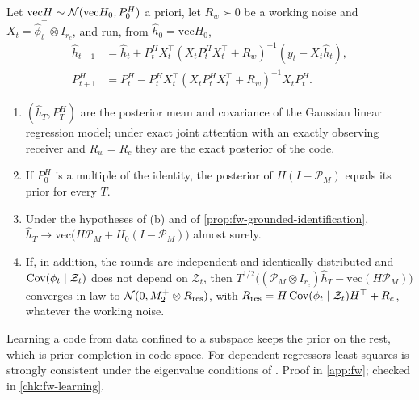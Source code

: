 \begin{proposition}\label{prop:fw-rls}
Let $\mathrm{vec}H\sim\mathcal{N}(\mathrm{vec}H_0,P^H_0)$ a priori, let $R_w\succ0$ be a working noise and $X_t=\hat\phi_t^\top\otimes I_{r_c}$, and run, from $\hat h_0=\mathrm{vec}H_0$,
\begin{equation}\label{eq:fw-rls}
\begin{aligned}
\hat h_{t+1}&=\hat h_t+P^H_tX_t^\top(X_tP^H_tX_t^\top+R_w)^{-1}(y_t-X_t\hat h_t),\\
P^H_{t+1}&=P^H_t-P^H_tX_t^\top(X_tP^H_tX_t^\top+R_w)^{-1}X_tP^H_t.
\end{aligned}
\end{equation}
\begin{enumerate}
\item[(a)] $(\hat h_T,P^H_T)$ are the posterior mean and covariance of the Gaussian linear regression model; under exact joint attention with an exactly observing receiver and $R_w=R_c$ they are the exact posterior of the code.
\item[(b)] If $P^H_0$ is a multiple of the identity, the posterior of $H(I-\mathcal P_M)$ equals its prior for every $T$.
\item[(c)] Under the hypotheses of (b) and of \cref{prop:fw-grounded-identification}, $\hat h_T\to\mathrm{vec}\bigl(H\mathcal P_M+H_0(I-\mathcal P_M)\bigr)$ almost surely.
\item[(d)] If, in addition, the rounds are independent and identically distributed and $\operatorname{Cov}(\phi_t\mid\mathcal Z_t)$ does not depend on $\mathcal Z_t$, then $T^{1/2}\bigl((\mathcal P_M\otimes I_{r_c})\hat h_T-\mathrm{vec}(H\mathcal P_M)\bigr)$ converges in law to $\mathcal{N}(0,M_2^+\otimes R_{\mathrm{res}})$, with $R_{\mathrm{res}}=H\operatorname{Cov}(\phi_t\mid\mathcal Z_t)H^\top+R_c$, whatever the working noise.
\end{enumerate}
\end{proposition}

Learning a code from data confined to a subspace keeps the prior on the rest, which is prior completion in code space. For dependent regressors least squares is strongly consistent under the eigenvalue conditions of \citet{lai1982least}. Proof in \cref{app:fw}; checked in \cref{chk:fw-learning}.

